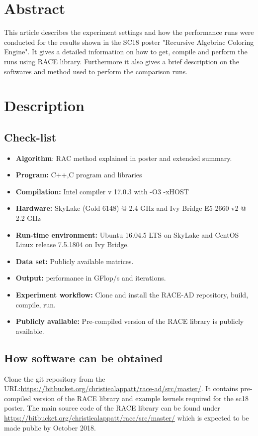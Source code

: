 \section{Abstract}
This article describes the experiment settings and how the performance runs were conducted for the results shown in the SC18 poster "Recursive Algebriac Coloring Engine". It gives a detailed information on how to get, compile and perform the runs using RACE library. Furthermore it also gives a brief description on the softwares and method used to perform the comparison runs.

\section{Description}
	\subsection{Check-list}
	\begin{itemize}
		\item \textbf{Algorithm}: RAC method explained in poster and extended summary.
		\item \textbf{Program:} C++,C program and libraries
		\item \textbf{Compilation:} Intel compiler v 17.0.3 with -O3 -xHOST
		\item \textbf{Hardware:} SkyLake (Gold 6148) @ 2.4 GHz and Ivy Bridge E5-2660 v2 @ 2.2 GHz
		\item \textbf{Run-time environment:} Ubuntu 16.04.5 LTS on SkyLake and CentOS Linux release 7.5.1804 on Ivy Bridge.
		\item \textbf{Data set:} Publicly available matrices.
		\item \textbf{Output:} performance in GFlop/s and iterations.
		\item \textbf{Experiment workflow:} Clone and install the RACE-AD repository, build, compile, run. 
		\item \textbf{Publicly available:} Pre-compiled version of the RACE library is publicly available.
	\end{itemize}
	
	\subsection{How software can be obtained}
	Clone the git repository from the URL:\url{https://bitbucket.org/christiealappatt/race-ad/src/master/}. It contains pre-compiled version of the RACE library and example kernels required for the sc18 poster. The main source code of the RACE library can be found under \url{https://bitbucket.org/christiealappatt/race/src/master/} which is expected to be made public by October 2018.
	
